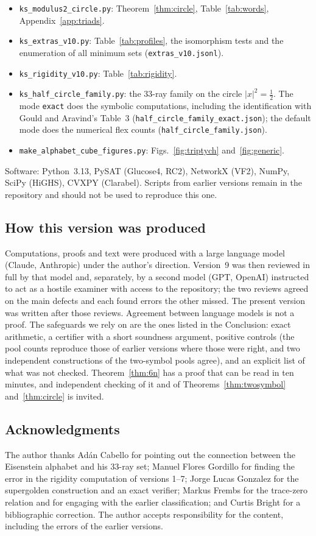 \begin{itemize}
\texttt{ks\_lean\_export.py}.
\item \texttt{ks\_modulus2\_circle.py}: Theorem~\ref{thm:circle}, Table~\ref{tab:words},
Appendix~\ref{app:triads}.
\item \texttt{ks\_extras\_v10.py}: Table~\ref{tab:profiles}, the isomorphism tests and the
enumeration of all minimum sets (\texttt{extras\_v10.jsonl}).
\item \texttt{ks\_rigidity\_v10.py}: Table~\ref{tab:rigidity}.
\item \texttt{ks\_half\_circle\_family.py}: the 33-ray family on the circle
$|x|^2=\tfrac12$.  The mode \texttt{exact} does the symbolic computations, including the
identification with Gould and Aravind's Table~3 (\texttt{half\_circle\_family\_exact.json}); the
default mode does the numerical flex counts (\texttt{half\_circle\_family.json}).
\item \texttt{make\_alphabet\_cube\_figures.py}: Figs.~\ref{fig:triptych} and~\ref{fig:generic}.
\end{itemize}

Software: Python~3.13, PySAT (Glucose4, RC2), NetworkX (VF2), NumPy, SciPy (HiGHS), CVXPY
(Clarabel).  Scripts from earlier versions remain in the repository and should not be used to
reproduce this one.

\subsection*{How this version was produced}

Computations, proofs and text were produced with a large language model (Claude, Anthropic)
under the author's direction.  Version~9 was then reviewed in full by that model and, separately,
by a second model (GPT, OpenAI) instructed to act as a hostile examiner with access to the
repository; the two reviews agreed on the main defects and each found errors the other missed.
The present version was written after those reviews.  Agreement between language models is not a
proof.  The safeguards we rely on are the ones listed in the Conclusion: exact arithmetic, a
certifier with a short soundness argument, positive controls (the pool counts reproduce those of earlier versions where
those were right, and two independent constructions of the two-symbol pools agree), and an explicit list of what was not checked.  Theorem~\ref{thm:6n} has a
proof that can be read in ten minutes, and independent checking of it and of
Theorems~\ref{thm:twosymbol} and~\ref{thm:circle} is invited.

\subsection*{Acknowledgments}

The author thanks Ad\'an Cabello for pointing out the connection between the Eisenstein alphabet
and his 33-ray set; Manuel Flores Gordillo for finding the error in the rigidity computation of
versions 1--7; Jorge Lucas Gonzalez for the supergolden construction and an exact verifier;
Markus Frembs for the trace-zero relation and for engaging with the earlier classification; and
Curtis Bright for a bibliographic correction.  The author accepts responsibility for the content,
including the errors of the earlier versions.

